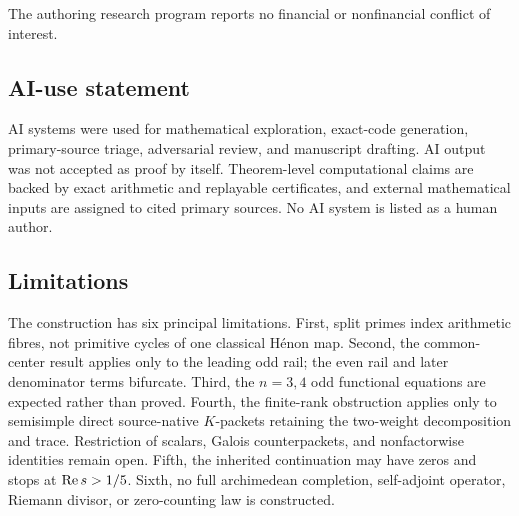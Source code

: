 The authoring research program reports no financial or nonfinancial
conflict of interest.

\subsection*{AI-use statement}

AI systems were used for mathematical exploration, exact-code generation,
primary-source triage, adversarial review, and manuscript drafting.  AI
output was not accepted as proof by itself.  Theorem-level computational
claims are backed by exact arithmetic and replayable certificates, and
external mathematical inputs are assigned to cited primary sources.  No AI
system is listed as a human author.

\subsection*{Limitations}

The construction has six principal limitations.  First, split primes index
arithmetic fibres, not primitive cycles of one classical H\'enon map.
Second, the common-center result applies only to the leading odd rail; the
even rail and later denominator terms bifurcate.  Third, the \(n=3,4\)
odd functional equations are expected rather than proved.  Fourth, the
finite-rank obstruction applies only to semisimple direct source-native
\(K\)-packets retaining the two-weight decomposition and trace.
Restriction of scalars, Galois counterpackets, and nonfactorwise identities
remain open.  Fifth, the inherited continuation may have zeros and stops at
\(\operatorname{Re} s>1/5\).  Sixth, no full archimedean completion, self-adjoint
operator, Riemann divisor, or zero-counting law is constructed.
